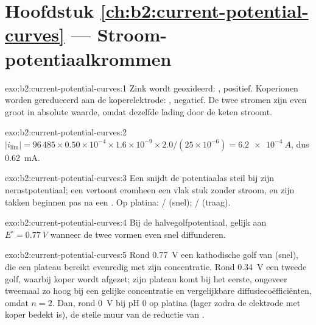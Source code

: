 \section*{Hoofdstuk \ref{ch:b2:current-potential-curves} --- Stroom-potentiaalkrommen}

\begin{solution}{exo:b2:current-potential-curves:1}
Zink wordt geoxideerd: , positief. Koperionen worden gereduceerd aan de
koperelektrode: , negatief. De twee stromen zijn even groot in
absolute waarde, omdat dezelfde lading door de keten stroomt.
\end{solution}

\begin{solution}{exo:b2:current-potential-curves:2}
$|i_{\lim}| = 96\,485 \times 0.50 \times 10^{-4} \times 1.6 \times 10^{-9} \times
2.0/(25 \times 10^{-6}) = \qty{6.2e-4}{A}$, dus \qty{0.62}{mA}.
\end{solution}

\begin{solution}{exo:b2:current-potential-curves:3}
Een  snijdt de potentiaalas steil bij zijn nernstpotentiaal; een  vertoont eromheen een vlak stuk zonder stroom, en zijn takken beginnen
pas na een . Op platina: / (snel);
/ (traag).
\end{solution}

\begin{solution}{exo:b2:current-potential-curves:4}
Bij de halvegolfpotentiaal, gelijk aan $E^\circ = \qty{0.77}{V}$ wanneer de twee vormen
even snel diffunderen.
\end{solution}

\begin{solution}{exo:b2:current-potential-curves:5}
Rond \qty{0.77}{V} een kathodische golf van  (snel), die een plateau bereikt
evenredig met zijn concentratie. Rond \qty{0.34}{V} een tweede golf, waarbij koper
wordt afgezet; zijn plateau komt bij het eerste, ongeveer tweemaal zo hoog bij een gelijke
concentratie en vergelijkbare diffusiecoëfficiënten, omdat $n = 2$. Dan, rond
\qty{0}{V} bij pH 0 op platina (lager zodra de elektrode met koper bedekt is),
de steile muur van de reductie van .
\end{solution}

